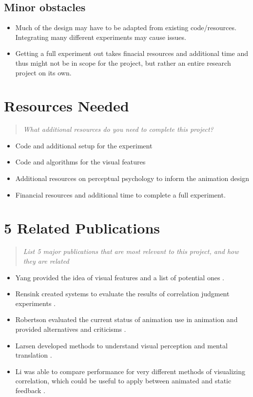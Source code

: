 \documentclass{proc}
\begin{document}
	\subsection{Minor obstacles}
	\begin{itemize}
		\item Much of the design may have to be adapted from existing code/resources. Integrating many different experiments may cause issues. 
		\item Getting a full experiment out takes finacial resources and additional time and thus might not be in scope for the project, but rather an entire research project on its own. 
	\end{itemize}
	\section{Resources Needed}
	\begin{quote}
		\textit{What additional resources do you need to complete this project?}
	\end{quote}
	\begin{itemize}
		\item Code and additional setup for the experiment
		\item Code and algorithms for the visual features
		\item Additional resources on perceptual psychology to inform the animation design
		\item Financial resources and additional time to complete a full experiment. 
	\end{itemize}
	\section{5 Related Publications}
	\begin{quote}
		\textit{List 5 major publications that are most relevant to this project, and how they are related}
	\end{quote}
	\begin{itemize}
		\item Yang provided the idea of visual features and a list of potential ones \cite{Yang2019}.
		\item Rensink created systems to evaluate the results of correlation judgment experiments \cite{Rensink2017}.
		\item Robertson evaluated the current status of animation use in animation and provided alternatives and criticisms \cite{Robertson2008}.
		\item Larsen developed methods to understand visual perception and mental translation \cite{larsen1998effects}.
		\item Li was able to compare performance for very different methods of visualizing correlation, which could be useful to apply between animated and static feedback \cite{Li2010}.
	\end{itemize}
\end{document}

